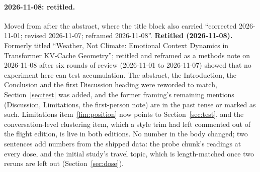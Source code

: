\documentclass[11pt,a4paper]{article}
\begin{document}
\paragraph{2026-11-08: retitled.} Moved from after the abstract, where
the title block also carried ``corrected 2026-11-01; revised 2026-11-07;
reframed 2026-11-08''.
\textbf{Retitled (2026-11-08).} Formerly titled ``Weather, Not
Climate: Emotional Context Dynamics in Transformer KV-Cache Geometry'';
retitled and reframed as a methods note on 2026-11-08 after six rounds
of review (2026-11-01 to 2026-11-07) showed that no experiment here can test accumulation. The
abstract, the Introduction, the Conclusion and the first Discussion
heading were reworded to match, Section~\ref{sec:test} was added, and
the former framing's remaining mentions (Discussion, Limitations, the
first-person note) are in the past tense or marked as such. Limitations
item~\ref{lim:position} now points to Section~\ref{sec:test}, and the conversation-level
clustering item, which a style trim had left commented out of the flight
edition, is live in both editions. No number in the body changed; two
sentences add numbers from the shipped data: the probe chunk's readings
at every dose, and the initial study's travel topic, which is
length-matched once two reruns are left out (Section~\ref{sec:dose}).
\end{document}

